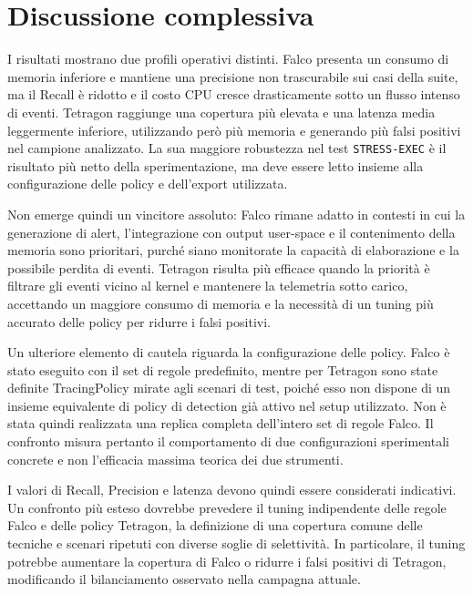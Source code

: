 \documentclass[12pt,a4paper,openright,twoside]{book}
\newcommand{\userspace}{\mbox{user-space}\xspace}
\begin{document}
\section{Discussione complessiva}
\label{sec:results-discussion}

I risultati mostrano due profili operativi distinti. Falco presenta un consumo di memoria inferiore e mantiene una precisione non trascurabile sui casi della suite, ma il Recall è ridotto e il costo CPU cresce drasticamente sotto un flusso intenso di eventi. Tetragon raggiunge una copertura più elevata e una latenza media leggermente inferiore, utilizzando però più memoria e generando più falsi positivi nel campione analizzato. La sua maggiore robustezza nel test \texttt{STRESS-EXEC} è il risultato più netto della sperimentazione, ma deve essere letto insieme alla configurazione delle policy e dell'export utilizzata.

Non emerge quindi un vincitore assoluto: Falco rimane adatto in contesti in cui la generazione di alert, l'integrazione con output \userspace e il contenimento della memoria sono prioritari, purché siano monitorate la capacità di elaborazione e la possibile perdita di eventi. Tetragon risulta più efficace quando la priorità è filtrare gli eventi vicino al kernel e mantenere la telemetria sotto carico, accettando un maggiore consumo di memoria e la necessità di un tuning più accurato delle policy per ridurre i falsi positivi.

Un ulteriore elemento di cautela riguarda la configurazione delle policy. Falco è stato eseguito con il set di regole predefinito, mentre per Tetragon sono state definite TracingPolicy mirate agli scenari di test, poiché esso non dispone di un insieme equivalente di policy di detection già attivo nel setup utilizzato. Non è stata quindi realizzata una replica completa dell'intero set di regole Falco. Il confronto misura pertanto il comportamento di due configurazioni sperimentali concrete e non l'efficacia massima teorica dei due strumenti.

I valori di Recall, Precision e latenza devono quindi essere considerati indicativi. Un confronto più esteso dovrebbe prevedere il tuning indipendente delle regole Falco e delle policy Tetragon, la definizione di una copertura comune delle tecniche e scenari ripetuti con diverse soglie di selettività. In particolare, il tuning potrebbe aumentare la copertura di Falco o ridurre i falsi positivi di Tetragon, modificando il bilanciamento osservato nella campagna attuale.
\end{document}
